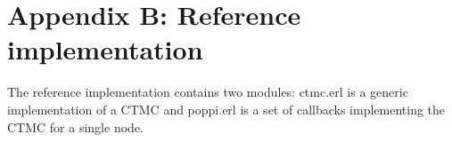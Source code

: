 \documentclass[a4paper,10pt]{article}
\newcommand{\code}[1]{
  \footnotesize
  
}
\begin{document}
\clearpage

\section*{Appendix B: Reference implementation}

The reference implementation contains two modules: ctmc.erl is a generic implementation of a CTMC and poppi.erl is a set of callbacks implementing the CTMC for a single node.

\clearpage
\code{../src/ctmc.erl}
\clearpage
\code{../src/poppi.erl}
\end{document}
